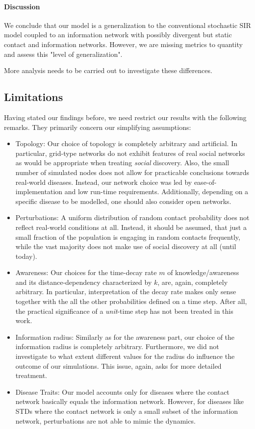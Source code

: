 \documentclass[11pt]{article}
\begin{document}
\paragraph{Discussion}
We conclude that our model is a generalization to the conventional stochastic SIR model coupled to an information network with possibly divergent but static contact and information networks. However, we are missing metrics to quantity and assess this "level of generalization".

More analysis needs to be carried out to investigate these differences.


\subsection{Limitations}

Having stated our findings before, we need restrict our results with the following remarks. They primarily concern our simplifying assumptions:

\begin{itemize}
  \item Topology: Our choice of topology is completely arbitrary and artificial. In particular, grid-type networks do not exhibit features of real social networks as would be appropriate when treating {\it social} discovery. Also, the small number of simulated nodes does not allow for practicable conclusions towards real-world diseases. Instead, our network choice was led by ease-of-implementation and low run-time requirements. Additionally, depending on a specific disease to be modelled, one should also consider open networks.
  \item Perturbations: A uniform distribution of random contact probability does not reflect real-world conditions at all. Instead, it should be assumed, that just a small fraction of the population is engaging in random contacts frequently, while the vast majority does not make use of social discovery at all (until today).
  \item Awareness: Our choices for the time-decay rate $m$ of knowledge/awareness and its distance-dependency characterized by $k$, are, again, completely arbitrary. In particular, interpretation of the decay rate makes only sense together with the all the other probabilities defined on a time step. After all, the practical significance of a {\it unit}-time step has not been treated in this work.
  \item Information radius: Similarly as for the awareness part, our choice of the information radius is completely arbitrary. Furthermore, we did not investigate to what extent different values for the radius do influence the outcome of our simulations. This issue, again, asks for more detailed treatment.
  \item Disease Traits: Our model accounts only for diseases where the contact network basically equals the information network. However, for diseases like STDs where the contact network is only a small subset of the information network, perturbations are not able to mimic the dynamics.
\end{itemize}
\end{document}
